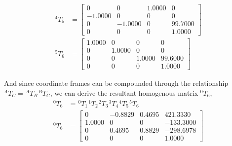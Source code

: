 \documentclass[12pt]{article}
\begin{document}
\begin{equation*}
\begin{split}
        ^{4}T_{5} & = \begin{bmatrix}
                          0       & 0       & 1.0000 & 0       \\
                          -1.0000 & 0       & 0      & 0       \\
                          0       & -1.0000 & 0      & 99.7000 \\
                          0       & 0       & 0      & 1.0000
                      \end{bmatrix}  \\
        ^{5}T_{6} & = \begin{bmatrix}
                          1.0000 & 0      & 0      & 0       \\
                          0      & 1.0000 & 0      & 0       \\
                          0      & 0      & 1.0000 & 99.6000 \\
                          0      & 0      & 0      & 1.0000
                      \end{bmatrix}
    \end{split}
\end{equation*}

And since coordinate frames can be compounded through the relationship $^{A}T_{C} =\hspace{1pt} ^{A}T_{B} \hspace{1pt} ^{B}T_{C}$, we can derive the resultant homogenous matrix $^{0}T_{6}$,
\begin{equation*}
    \begin{split}
        ^{0}T_{6} & = \hspace{1pt} ^{0}T_{1} \hspace{1pt} ^{1}T_{2}\hspace{1pt} ^{2}T_{3}\hspace{1pt} ^{3}T_{4}\hspace{1pt} ^{4}T_{5}\hspace{1pt} ^{5}T_{6} \\
        ^{0}T_{6} & = \begin{bmatrix}
                          0      & -0.8829 & 0.4695 & 421.3330  \\
                          1.0000 & 0       & 0      & -133.3000 \\
                          0      & 0.4695  & 0.8829 & -298.6978 \\
                          0      & 0       & 0      & 1.0000
                      \end{bmatrix}
    \end{split}
\end{equation*}
\end{document}
